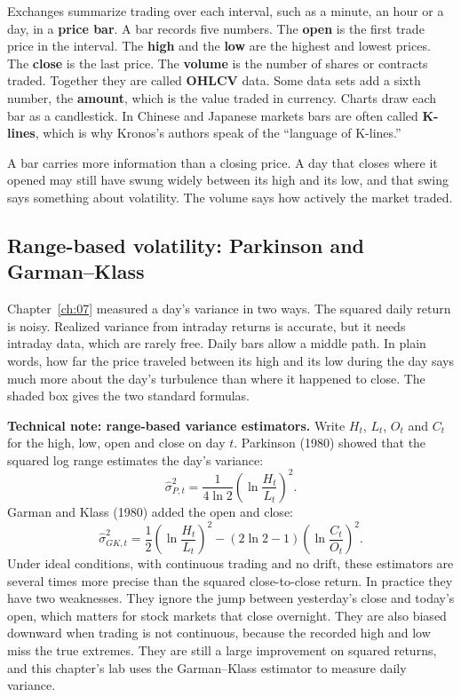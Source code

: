 Exchanges summarize trading over each interval, such as a minute, an hour or a day, in a \textbf{price bar}. A bar records five numbers. The \textbf{open} is the first trade price in the interval. The \textbf{high} and the \textbf{low} are the highest and lowest prices. The \textbf{close} is the last price. The \textbf{volume} is the number of shares or contracts traded. Together they are called \textbf{OHLCV} data. Some data sets add a sixth number, the \textbf{amount}, which is the value traded in currency. Charts draw each bar as a candlestick. In Chinese and Japanese markets bars are often called \textbf{K-lines}, which is why Kronos's authors speak of the ``language of K-lines.''

A bar carries more information than a closing price. A day that closes where it opened may still have swung widely between its high and its low, and that swing says something about volatility. The volume says how actively the market traded.

\subsection{Range-based volatility: Parkinson and Garman--Klass}

Chapter~\ref{ch:07} measured a day's variance in two ways. The squared daily return is noisy. Realized variance from intraday returns is accurate, but it needs intraday data, which are rarely free. Daily bars allow a middle path. In plain words, how far the price traveled between its high and its low during the day says much more about the day's turbulence than where it happened to close. The shaded box gives the two standard formulas.

\begin{technote}
\textbf{Technical note: range-based variance estimators.} Write $H_t$, $L_t$, $O_t$ and $C_t$ for the high, low, open and close on day $t$. Parkinson (1980) showed that the squared log range estimates the day's variance:
\begin{equation}
  \hat\sigma^2_{P,t} = \frac{1}{4 \ln 2} \left(\ln \frac{H_t}{L_t}\right)^2.
  \label{eq:23-parkinson}
\end{equation}
Garman and Klass (1980) added the open and close:
\begin{equation}
  \hat\sigma^2_{GK,t} = \frac{1}{2} \left(\ln \frac{H_t}{L_t}\right)^2 - \left(2\ln 2 - 1\right) \left(\ln \frac{C_t}{O_t}\right)^2.
  \label{eq:23-gk}
\end{equation}
Under ideal conditions, with continuous trading and no drift, these estimators are several times more precise than the squared close-to-close return. In practice they have two weaknesses. They ignore the jump between yesterday's close and today's open, which matters for stock markets that close overnight. They are also biased downward when trading is not continuous, because the recorded high and low miss the true extremes. They are still a large improvement on squared returns, and this chapter's lab uses the Garman--Klass estimator to measure daily variance.
\end{technote}

